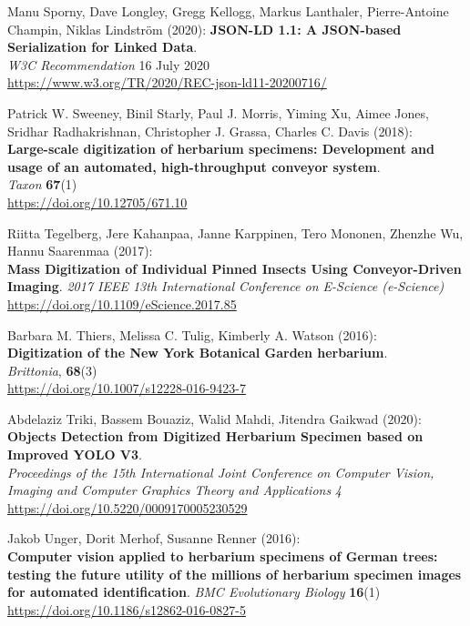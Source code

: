 \begin{thebibliography}{9}
Manu Sporny, Dave Longley,  Gregg Kellogg,  Markus Lanthaler,  Pierre-Antoine Champin, Niklas Lindström (2020):
\textbf{JSON-LD 1.1: A JSON-based Serialization for Linked Data}.\\
\emph{W3C Recommendation} 16 July 2020\\
\url{https://www.w3.org/TR/2020/REC-json-ld11-20200716/}

Patrick W. Sweeney, Binil Starly, Paul J. Morris, Yiming Xu, Aimee Jones, Sridhar Radhakrishnan, Christopher J. Grassa, Charles C. Davis (2018):\\
\textbf{Large-scale digitization of herbarium specimens: Development and usage of an
automated, high-throughput conveyor system}.\\
\emph{Taxon} \textbf{67}(1)\\
\url{https://doi.org/10.12705/671.10}

Riitta Tegelberg, Jere Kahanpaa, Janne Karppinen, Tero Mononen, Zhenzhe Wu, Hannu Saarenmaa (2017):\\
\textbf{Mass Digitization of Individual Pinned Insects Using Conveyor-Driven Imaging}.
\emph{2017 IEEE 13th International Conference on E-Science (e-Science)}\\
\url{https://doi.org/10.1109/eScience.2017.85}

Barbara M. Thiers, Melissa C. Tulig, Kimberly A. Watson (2016):\\
\textbf{Digitization of the New York Botanical Garden herbarium}.\\
\emph{Brittonia}, \textbf{68}(3)\\
\url{https://doi.org/10.1007/s12228-016-9423-7}

Abdelaziz Triki, Bassem Bouaziz, Walid Mahdi, Jitendra Gaikwad (2020):\\
\textbf{Objects Detection from Digitized Herbarium Specimen based on Improved
YOLO V3}.\\
\emph{Proceedings of the 15th International Joint Conference on Computer Vision, Imaging and Computer Graphics Theory and Applications} 
\emph{4}\\
\url{https://doi.org/10.5220/0009170005230529}

Jakob Unger, Dorit Merhof, Susanne Renner (2016):\\
\textbf{Computer vision applied to
herbarium specimens of German trees: testing the future utility of the
millions of herbarium specimen images for automated identification}. 
\emph{BMC Evolutionary Biology} \textbf{16}(1)
\url{https://doi.org/10.1186/s12862-016-0827-5}


\end{thebibliography}
